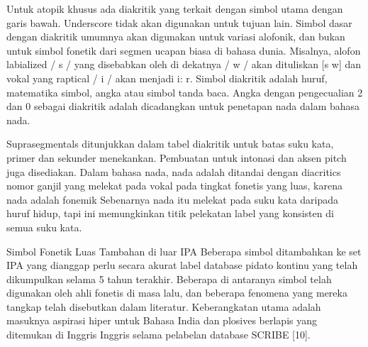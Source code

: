 	Untuk atopik khusus ada diakritik yang terkait dengan simbol utama dengan garis bawah.
	Underscore tidak akan digunakan untuk tujuan lain. Simbol dasar dengan diakritik umumnya akan digunakan untuk variasi alofonik, dan bukan untuk simbol fonetik dari segmen ucapan biasa di bahasa dunia. Misalnya, alofon labialized / s / yang disebabkan oleh di dekatnya / w / akan dituliskan [s w] dan vokal yang raptical / i / akan menjadi i: r. Simbol diakritik adalah huruf, matematika simbol, angka atau simbol tanda baca. Angka dengan pengecualian 2 dan 0 sebagai diakritik adalah dicadangkan untuk penetapan nada dalam bahasa nada.

	Suprasegmentals ditunjukkan dalam tabel diakritik untuk batas suku kata, primer dan sekunder
    menekankan. Pembuatan untuk intonasi dan aksen pitch juga disediakan. Dalam bahasa nada, nada adalah
    ditandai dengan diacritics nomor ganjil yang melekat pada vokal pada tingkat fonetis yang luas, karena nada
    adalah fonemik Sebenarnya nada itu melekat pada suku kata daripada huruf hidup, tapi ini
    memungkinkan titik pelekatan label yang konsisten di semua suku kata.

	Simbol Fonetik Luas Tambahan di luar IPA
	Beberapa simbol ditambahkan ke set IPA yang dianggap perlu secara akurat
	label database pidato kontinu yang telah dikumpulkan selama 5 tahun terakhir. Beberapa di antaranya
	simbol telah digunakan oleh ahli fonetis di masa lalu, dan beberapa fenomena yang mereka tangkap
	telah disebutkan dalam literatur. Keberangkatan utama adalah masuknya aspirasi hiper untuk
	Bahasa India dan plosives berlapis yang ditemukan di Inggris Inggris selama pelabelan
	database SCRIBE [10]. 

